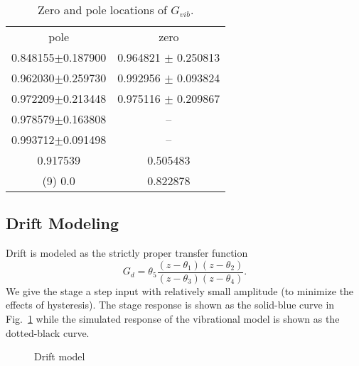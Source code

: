 \documentclass[journal,twocolumn,twoside]{IEEEtran}
\begin{document}
\begin{table}
  \centering
  \caption{Zero and pole locations of $G_{vib}$. }
  \label{tab:pzgvib}
  \begin{tabular}{cc}
    pole & zero\\
    0.848155$\pm$0.187900 & 0.964821 $\pm$ 0.250813\\ 
    0.962030$\pm$0.259730 & 0.992956 $\pm$ 0.093824\\ 
    0.972209$\pm$0.213448 & 0.975116 $\pm$ 0.209867\\ 
    0.978579$\pm$0.163808 & --\\ 
    0.993712$\pm$0.091498 & --\\ 
    0.917539 & 0.505483 \\ 
    (9) 0.0 & 0.822878 \\ 
  \end{tabular}
\end{table}


\subsection{Drift Modeling}\label{sec:drift_model}




Drift is modeled as the strictly proper transfer function
\begin{equation}
G_d = \theta_5\frac{(z-\theta_1)(z-\theta_2)}{(z-\theta_3)(z-\theta_4)}.
\end{equation}
We give the stage a step input with relatively small amplitude (to minimize the effects of hysteresis). The stage response is shown as the solid-blue curve in Fig.~\ref{fig:drift_fit} while the simulated response of the vibrational model is shown as the dotted-black curve. 

\begin{figure}
  
  \caption{Drift model}
  \label{fig:drift_fit}
\end{figure}
\end{document}
